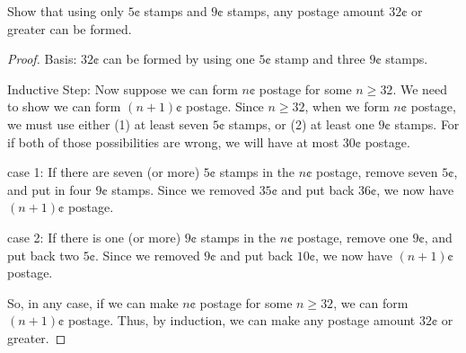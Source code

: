 \clearpage
\begin{exmp} Show that using only $5\cent$ stamps and  $9\cent$
stamps,
any postage amount $32\cent$ or greater can be formed.
\begin{proof}
 \textsf{Basis:}  $32\cent$ can be formed by using one $5\cent$ stamp
 and three $9\cent$ stamps.
 
 \textsf{Inductive Step:} Now suppose we can form $n\cent$ postage for some
 $n\geq 32$. We need to show we can form $(n+1)\cent$ postage.
 Since $n\geq 32$, when we form  $n\cent$ postage, we must use either
 (1) at least seven $5\cent$ stamps, or (2) at least one  $9\cent$ 
 stamps. For if both of those possibilities are wrong, we will have at most
 $30\cent$ postage.
 
 \textsf{case 1:} If there are seven (or more) $5\cent$ stamps in the 
 $n\cent$ postage, remove seven $5\cent$, and put in 
 four $9\cent$ stamps. Since we removed $35\cent$ and
 put back $36\cent$, we now have  $(n+1)\cent$ postage.
 
 \textsf{case 2:} If there is one (or more)  $9\cent$ stamps in the
 $n\cent$ postage, remove one  $9\cent$, and put back
 two $5\cent$. Since we removed  $9\cent$ and put back
  $10\cent$, we now have $(n+1)\cent$ postage.
 
 So, in any case, if we can make  $n\cent$ postage for some
 $n\geq 32$, we can form $(n+1)\cent$ postage. Thus, by induction,
 we can make any postage amount  $32\cent$ or greater.
\end{proof}
\end{exmp}

